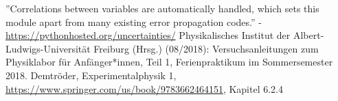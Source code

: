 \documentclass[11pt,a4paper]{article}
\begin{document}
\begin{thebibliography}{9}
''Correlations between variables are automatically handled, which sets this module apart from many existing error propagation codes.'' - \url{https://pythonhosted.org/uncertainties/}
 Physikalisches Institut der Albert-Ludwigs-Universität Freiburg (Hrsg.) (08/2018): Versuchsanleitungen zum Physiklabor für Anfänger*innen, Teil 1, Ferienpraktikum im Sommersemester 2018.
 Demtr\"oder, Experimentalphysik 1, \url{https://www.springer.com/us/book/9783662464151}, Kapitel 6.2.4
\end{thebibliography}
\end{document}

